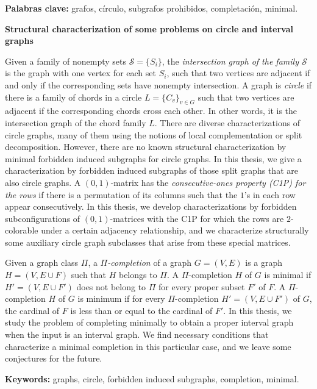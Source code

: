 \documentclass[12pt]{book}
\theoremstyle{plain}
\theoremstyle{remark}
\newenvironment{abstract}%
{\clearpage\null \vfill\begin{center}%
\bfseries \abstractname \end{center}}%
{\vfill\null}
\begin{document}
\begin{abstract}
\vspace{2mm}
\textbf{Palabras clave:} grafos, círculo, subgrafos prohibidos, completación, minimal.

\end{abstract}


%
\begin{abstract}

\begin{center}
\textbf{Structural characterization of some problems on circle and interval graphs}
\end{center}


Given a family of nonempty sets $\mathcal{S} = \{S_i\}$, the \emph{intersection graph of the family $\mathcal{S}$} is the graph with one vertex for each set $S_i$, such that two vertices are adjacent if and only if the corresponding sets have nonempty intersection. A graph is \emph{circle} if there is a family of chords in a circle $L= \{ C_v \}_{v\in G}$ such that two vertices are adjacent if the corresponding chords cross each other. In other words, it is the intersection graph of the chord family $L$.
There are diverse characterizations of circle graphs, many of them using the notions of local complementation or split decomposition. However, there are no known structural characterization by minimal forbidden induced subgraphs for circle graphs. In this thesis, we give a characterization by forbidden induced subgraphs of those split graphs that are also circle graphs.
A $(0,1)$-matrix has the \emph{consecutive-ones property (C1P) for the rows }if there is a permutation of its columns such that the $1$'s in each row appear consecutively. In this thesis, we develop characterizations by forbidden subconfigurations of $(0,1)$-matrices with the C1P for which the rows are $2$-colorable under a certain adjacency relationship, and we characterize structurally some auxiliary circle graph subclasses that arise from these special matrices. 

Given a graph class $\Pi$, a \emph{$\Pi$-completion} of a graph $G = (V,E)$ is a graph $H = (V, E \cup F)$ such that $H$ belongs to $\Pi$. 
A $\Pi$-completion $H$ of $G$ is minimal if $H'= (V, E \cup F')$ does not belong to $\Pi$ for every proper subset $F'$ of $F$. 
A $\Pi$-completion $H$ of $G$ is minimum if for every $\Pi$-completion $H' = (V, E \cup F')$ of $G$, the cardinal of $F$ is less than or equal to the cardinal of $F'$.
In this thesis, we study the problem of completing minimally to obtain a proper interval graph when the input is an interval graph. We find necessary conditions that characterize a minimal completion in this particular case, and we leave some conjectures for the future.

\vspace{2mm}
\textbf{Keywords:} graphs, circle, forbidden induced subgraphs, completion, minimal.
\end{abstract}
\end{document}
